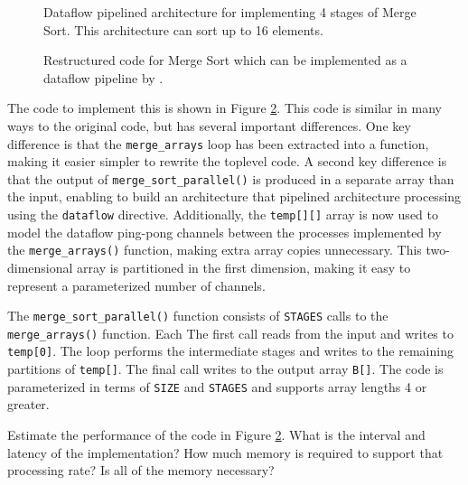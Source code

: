 \begin{figure}
\centering
{\tiny }
\caption{Dataflow pipelined architecture for implementing 4 stages of Merge Sort.  This architecture can sort up to 16 elements.}
\label{fig:restructured_mergesort_dataflow}
\end{figure}

\begin{figure}
{\tiny 
}
\caption{Restructured code for Merge Sort which can be implemented as a dataflow pipeline by \VHLS.}
\label{fig:merge_sort_parallel.cpp}
\end{figure}

The code to implement this is shown in Figure \ref{fig:merge_sort_parallel.cpp}.  This code is similar in many ways to the original code, but has several important differences.  One key difference is that the \lstinline{merge_arrays} loop has been extracted into a function, making it easier simpler to rewrite the toplevel code. A second key difference is that the output of \lstinline{merge_sort_parallel()} is produced in a separate array than the input, enabling \VHLS to build an architecture that pipelined architecture processing using the \lstinline{dataflow} directive.  Additionally, the \lstinline{temp[][]} array is now used to model the dataflow ping-pong channels between the processes implemented by the \lstinline{merge_arrays()} function, making extra array copies unnecessary.  This two-dimensional array is partitioned in the first dimension, making it easy to represent a parameterized number of channels.

The \lstinline{merge_sort_parallel()} function consists of \lstinline{STAGES} calls to the \lstinline{merge_arrays()} function.  Each The first call reads from the input and writes to \lstinline{temp[0]}.  The loop performs the intermediate stages  and writes to the remaining partitions of \lstinline{temp[]}.  The final call writes to the output array \lstinline{B[]}.  The code is parameterized in terms of \lstinline{SIZE} and \lstinline{STAGES} and supports array lengths 4 or greater.

\begin{aside}
Estimate the performance of the code in Figure \ref{fig:merge_sort_parallel.cpp}.  What is the interval and latency of the implementation?  How much memory is required to support that processing rate?   Is all of the memory necessary?
\end{aside}

